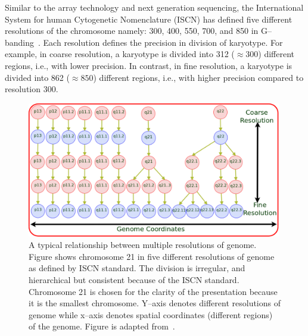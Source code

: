 Similar to the array technology and next generation sequencing, 
the International System for human Cytogenetic Nomenclature (ISCN)
has defined five different resolutions of the chromosome namely:
300, 400, 550, 700, and 850 in G--banding~\cite{shaffer05}. Each resolution 
defines the precision in division of karyotype. 
For example, in coarse resolution, a karyotype is divided into 
312 ($\approx 300$) different regions, i.e., with lower precision.
In contrast, in fine resolution, a karyotype is divided into 862
($\approx 850$) different regions, i.e., with higher precision
compared to resolution 300.




\begin{figure}[h!]
\centering
\includegraphics[trim=10mm 5mm 20mm 0mm,width=0.99\textwidth]{figures/chain}
\caption[Multiple Resolutions of the Genome.]{A typical 
relationship between multiple resolutions of genome.  
Figure shows chromosome 21 in five different resolutions 
of genome as defined by ISCN standard. The division is irregular,
and hierarchical but consistent because of the ISCN standard.
Chromosome 21 is chosen for the clarity of the presentation 
because it is the smallest chromosome. Y--axis denotes different resolutions
of genome while x--axis denotes spatial coordinates (different regions) of the genome.
Figure is adapted from~.} 
\label{Fig:chr21}
\end{figure}



